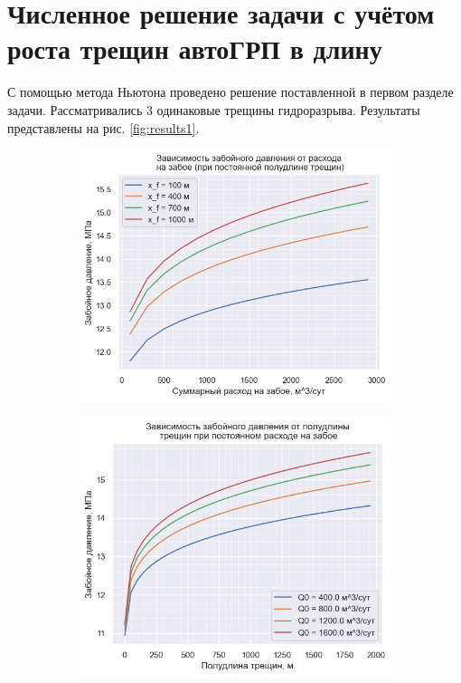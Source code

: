 \chapter{Численное решение задачи с учётом роста трещин автоГРП в длину} \label{ch3}


С помощью метода Ньютона проведено решение поставленной в первом разделе задачи.
Рассматривались 3 одинаковые трещины гидроразрыва.
Результаты представлены на рис. \ref{fig:results1}.

\begin{figure}[H]
	\begin{subfigure}[t]{\dimexpr.5\linewidth-1.3em\relax}
		\centering
		\includegraphics[width=.95\linewidth,valign=t]{images/p_0(q_0).png}
	\end{subfigure}
\hfill %
	\begin{subfigure}[t]{\dimexpr.5\linewidth-1.3em\relax}
		\centering
		\includegraphics[width=.95\linewidth,valign=t]{images/p_0(x_f).png}

\end{subfigure}
\end{figure}
